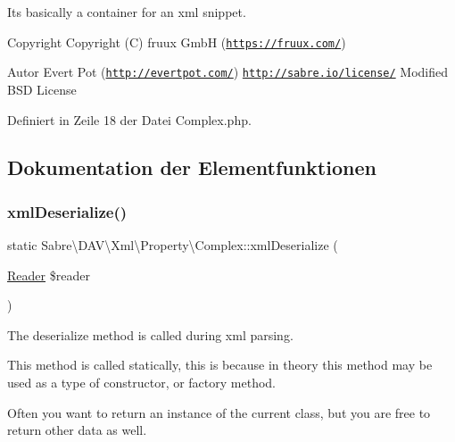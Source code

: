 It\textquotesingle{}s basically a container for an xml snippet.

\begin{DoxyCopyright}{Copyright}
Copyright (C) fruux GmbH (\href{https://fruux.com/}{\tt https\+://fruux.\+com/}) 
\end{DoxyCopyright}
\begin{DoxyAuthor}{Autor}
Evert Pot (\href{http://evertpot.com/}{\tt http\+://evertpot.\+com/})  \href{http://sabre.io/license/}{\tt http\+://sabre.\+io/license/} Modified B\+SD License 
\end{DoxyAuthor}


Definiert in Zeile 18 der Datei Complex.\+php.



\subsection{Dokumentation der Elementfunktionen}
\mbox{\label{class_sabre_1_1_d_a_v_1_1_xml_1_1_property_1_1_complex_a6c74a2adbbaaac3558dadde60a473220}} 
\subsubsection{\texorpdfstring{xml\+Deserialize()}{xmlDeserialize()}}
{\footnotesize\ttfamily static Sabre\textbackslash{}\+D\+A\+V\textbackslash{}\+Xml\textbackslash{}\+Property\textbackslash{}\+Complex\+::xml\+Deserialize (\begin{DoxyParamCaption}\item[{\mbox{\hyperlink{class_sabre_1_1_xml_1_1_reader}{Reader}}}]{\$reader }\end{DoxyParamCaption})\hspace{0.3cm}{\ttfamily [static]}}

The deserialize method is called during xml parsing.

This method is called statically, this is because in theory this method may be used as a type of constructor, or factory method.

Often you want to return an instance of the current class, but you are free to return other data as well.

